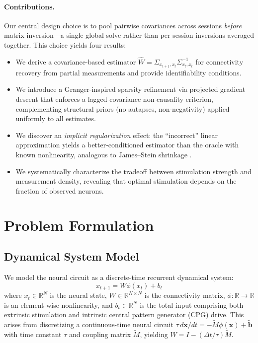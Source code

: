 \documentclass{article}
\begin{document}
\paragraph{Contributions.}
Our central design choice is to pool pairwise covariances across sessions \emph{before} matrix inversion---a single global solve rather than per-session inversions averaged together. This choice yields four results:
\begin{itemize}
    \item We derive a covariance-based estimator $\hat{W} = \Sigma_{x_{t+1},x_t} \Sigma_{x_t,x_t}^{-1}$ for connectivity recovery from partial measurements and provide identifiability conditions.
    \item We introduce a Granger-inspired \citep{granger1969investigating} sparsity refinement via projected gradient descent that enforces a lagged-covariance non-causality criterion, complementing structural priors (no autapses, non-negativity) applied uniformly to all estimates.
    \item We discover an \emph{implicit regularization} effect: the ``incorrect'' linear approximation yields a better-conditioned estimator than the oracle with known nonlinearity, analogous to James--Stein shrinkage \citep{james1961estimation}.
    \item We systematically characterize the tradeoff between stimulation strength and measurement density, revealing that optimal stimulation depends on the fraction of observed neurons.
\end{itemize}

\section{Problem Formulation}
\label{sec:formulation}

\subsection{Dynamical System Model}

We model the neural circuit as a discrete-time recurrent dynamical system:
\begin{equation}
    x_{t+1} = W \phi(x_t) + b_t
    \label{eq:dynamics}
\end{equation}
where $x_t \in \mathbb{R}^N$ is the neural state, $W \in \mathbb{R}^{N \times N}$ is the connectivity matrix, $\phi: \mathbb{R} \to \mathbb{R}$ is an element-wise nonlinearity, and $b_t \in \mathbb{R}^N$ is the total input comprising both extrinsic stimulation and intrinsic central pattern generator (CPG) drive.
This arises from discretizing a continuous-time neural circuit $\tau \, d\mathbf{x}/dt = -\tilde{M} \phi(\mathbf{x}) + \tilde{\mathbf{b}}$ with time constant $\tau$ and coupling matrix $\tilde{M}$, yielding $W = I - (\Delta t / \tau)\tilde{M}$.
\end{document}
